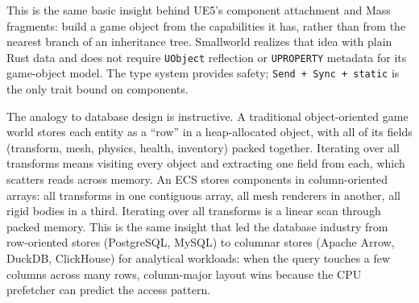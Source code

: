 \documentclass[
  11pt,
  letterpaper,
  DIV=11,
  numbers=noendperiod,
  twoside,
  open=right]{scrreprt}
\newenvironment{Shaded}{}{}
\newcommand{\CommentTok}[1]{\textcolor[rgb]{0.42,0.45,0.49}{#1}}
\newcommand{\ConstantTok}[1]{\textcolor[rgb]{0.00,0.36,0.77}{#1}}
\newcommand{\DecValTok}[1]{\textcolor[rgb]{0.00,0.36,0.77}{#1}}
\newcommand{\KeywordTok}[1]{\textcolor[rgb]{0.84,0.23,0.29}{#1}}
\newcommand{\NormalTok}[1]{\textcolor[rgb]{0.14,0.16,0.18}{#1}}
\newcommand{\OperatorTok}[1]{\textcolor[rgb]{0.14,0.16,0.18}{#1}}
\newcommand{\PreprocessorTok}[1]{\textcolor[rgb]{0.84,0.23,0.29}{#1}}
\renewenvironment{Shaded}{\begin{snugshade}\small\setstretch{0.95}}{\end{snugshade}}
\begin{document}
%

This is the same basic insight behind UE5's component attachment and
Mass fragments: build a game object from the capabilities it has, rather
than from the nearest branch of an inheritance tree. Smallworld realizes
that idea with plain Rust data and does not require \texttt{UObject}
reflection or \texttt{UPROPERTY} metadata for its game-object model. The
type system provides safety;
\texttt{Send\ +\ Sync\ +\ \textquotesingle{}static} is the only trait
bound on components.

The analogy to database design is instructive. A traditional
object-oriented game world stores each entity as a ``row'' in a
heap-allocated object, with all of its fields (transform, mesh, physics,
health, inventory) packed together. Iterating over all transforms means
visiting every object and extracting one field from each, which scatters
reads across memory. An ECS stores components in column-oriented arrays:
all transforms in one contiguous array, all mesh renderers in another,
all rigid bodies in a third. Iterating over all transforms is a linear
scan through packed memory. This is the same insight that led the
database industry from row-oriented stores (PostgreSQL, MySQL) to
columnar stores (Apache Arrow, DuckDB, ClickHouse) for analytical
workloads: when the query touches a few columns across many rows,
column-major layout wins because the CPU prefetcher can predict the
access pattern.
\end{document}
